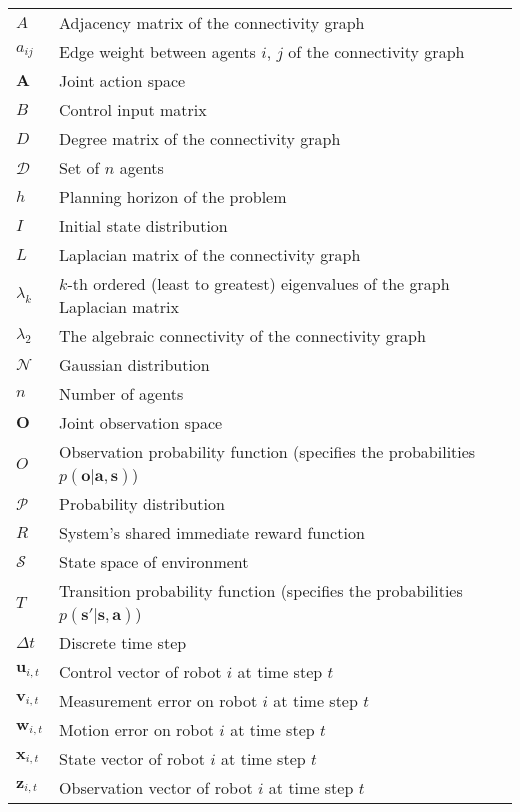 \documentclass[conf]{new-aiaa}
\newcommand{\A }{\boldsymbol{A}}
\newcommand{\D}{\mathscr{D}}
\newcommand{\N}{\mathcal{N}}
\newcommand{\Observation}{\boldsymbol{O}}
\newcommand{\Prob}{\mathscr{P}}
\newcommand{\Sstate}{\mathcal{S}}
\newcommand{\ucontrol}{\boldsymbol{u}}
\newcommand{\verr}{\boldsymbol{v}}
\newcommand{\w}{\boldsymbol{w}}
\newcommand{\x}{\boldsymbol{x}}
\newcommand{\z}{\boldsymbol{z}}
\begin{document}
{\renewcommand\arraystretch{1.0}
\noindent\begin{longtable*}{@{}l @{\quad=\quad} l@{}}
$A$ & Adjacency matrix of the connectivity graph \\
$a_{ij}$ & Edge weight between agents $i$, $j$ of the connectivity graph \\
$\A$ & Joint action space \\
$B$ & Control input matrix \\
$D$ & Degree matrix of the connectivity graph  \\
$\D$  & Set of $n$ agents \\
$h$ & Planning horizon of the problem\\
$I$ & Initial state distribution \\ 
$L$ & Laplacian matrix of the connectivity graph \\
$\lambda_k$ & $k$-th ordered (least to greatest) eigenvalues of the graph Laplacian matrix \\
$\lambda_2$ & The algebraic connectivity of the connectivity graph \\
$\N$ & Gaussian distribution \\
$n$ & Number of agents \\
$\Observation$   & Joint observation space \\
$O$ & Observation probability function (specifies the probabilities $p\left( \boldsymbol{o}|\boldsymbol{a}, \boldsymbol{s}\right)$)\\
$\Prob$ & Probability distribution \\
$R$ & System's shared immediate reward function \\
$\Sstate$ & State space of environment \\
$T$ & Transition probability function (specifies the probabilities $p\left(\boldsymbol{s'}|\boldsymbol{s}, \boldsymbol{a}\right)$) \\
$\Delta t$ & Discrete time step \\
$\ucontrol_{i, t}$ & Control vector of robot $i$ at time step $t$ \\
$\verr_{i, t}$ & Measurement error on robot $i$ at time step $t$ \\
$\w_{i, t}$ & Motion error on robot $i$ at time step $t$ \\
$\x_{i, t}$ & State vector of robot $i$ at time step $t$ \\
$\z_{i, t}$ & Observation vector of robot $i$ at time step $t$
\end{longtable*}}
\end{document}
